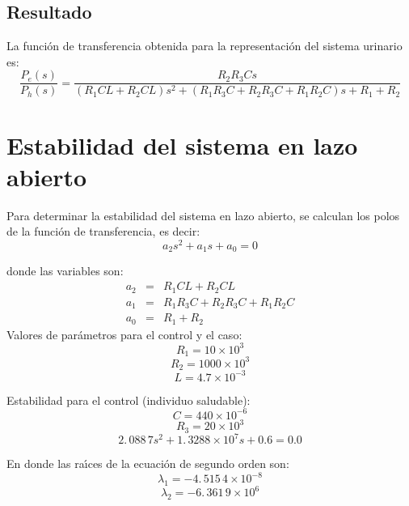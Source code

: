 \documentclass[letterpaper,11pt]{article}
\begin{document}
\subsection{Resultado}

La funci\'{o}n de transferencia obtenida para la representaci\'{o}n del
sistema urinario es:%
\begin{equation*}
\frac{P_{e}(s)}{P_{h}(s)}=\frac{R_{2}R_{3}Cs}{\left( R_{1}CL+R_{2}CL\right)
s^{2}+\left( R_{1}R_{3}C+R_{2}R_{3}C+R_{1}R_{2}C\right) s+R_{1}+R_{2}}
\end{equation*}

\section{Estabilidad del sistema en lazo abierto}

Para determinar la estabilidad del sistema en lazo abierto, se calculan los
polos de la funci\'{o}n de transferencia, es decir:%
\begin{equation*}
a_{2}s^{2}+a_{1}s+a_{0}=0
\end{equation*}

donde las variables son:%
\begin{eqnarray*}
a_{2} &=&R_{1}CL+R_{2}CL \\
a_{1} &=&R_{1}R_{3}C+R_{2}R_{3}C+R_{1}R_{2}C \\
a_{0} &=&R_{1}+R_{2}
\end{eqnarray*}%
Valores de par\'{a}metros para el control y el caso:%
\begin{equation*}
R_{1}=10\times 10^{3}
\end{equation*}%
\begin{equation*}
R_{2}=1000\times 10^{3}
\end{equation*}%
\begin{equation*}
L=4.7\times 10^{-3}
\end{equation*}

Estabilidad para el control (individuo saludable):%
\begin{equation*}
C=440\times 10^{-6}
\end{equation*}%
\begin{equation*}
R_{3}=20\times 10^{3}
\end{equation*}%
\begin{equation*}
2.\,\allowbreak 088\,7s^{2}+1.\,\allowbreak 3288\times 10^{7}s+0.6=0.0
\end{equation*}

En donde las ra\'{\i}ces de la ecuaci\'{o}n de segundo orden son:%
\begin{equation*}
\lambda _{1}=-4.\,\allowbreak 515\,4\times 10^{-8}
\end{equation*}%
\begin{equation*}
\lambda _{2}=-6.\,\allowbreak 361\,9\times 10^{6}
\end{equation*}
\end{document}
